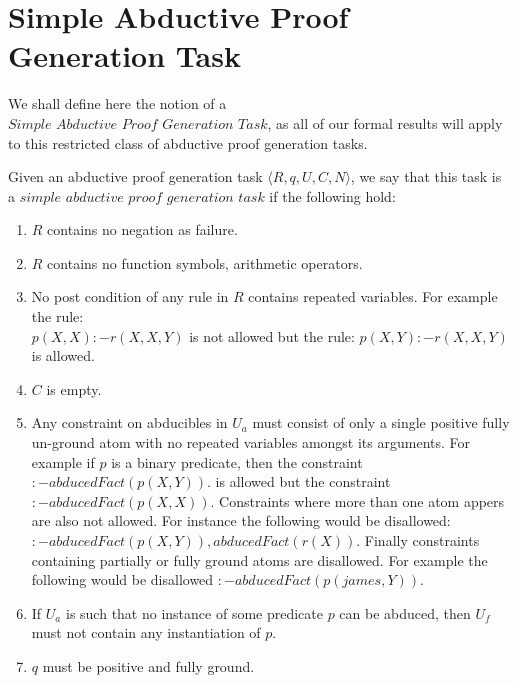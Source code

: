 \section{Simple Abductive Proof Generation Task}
We shall define here the notion of a\\
$
\textit{Simple Abductive Proof Generation Task}$, as all of our formal results will apply to this restricted class of abductive proof generation tasks.
\begin{definition}\label{simpletask}
Given an abductive proof generation task $\langle R,q,U,C,N \rangle$, we say that this task is a $\textit{simple abductive proof generation task}$ if the following hold:
\begin{enumerate}
\item $R$ contains no negation as failure.
\item $R$ contains no function symbols, arithmetic operators.
\item No post condition of any rule in $R$ contains repeated variables. For example the rule:\\
$p(X,X):-r(X,X,Y)$ is not allowed but the rule: $p(X,Y):-r(X,X,Y)$ is allowed.
\item $C$ is empty.
\item Any constraint on abducibles in $U_{a}$ must consist of only a single positive fully un-ground atom with no repeated variables amongst its arguments. For example if $p$ is a binary predicate, then the constraint $:-abducedFact(p(X,Y)).$ is allowed but the constraint $:-abducedFact(p(X,X)).$ Constraints where more than one atom appers are also not allowed. For instance the following would be disallowed: $:-abducedFact(p(X,Y)),abducedFact(r(X)).$ Finally constraints containing partially or fully ground atoms are disallowed. For example the following would be disallowed $:-abducedFact(p(james,Y)).$
\item If $U_{a}$ is such that no instance of some predicate $p$ can be abduced, then $U_{f}$ must not contain any instantiation of $p$.
\item $q$ must be positive and fully ground.
\\
\end{enumerate}
\end{definition}